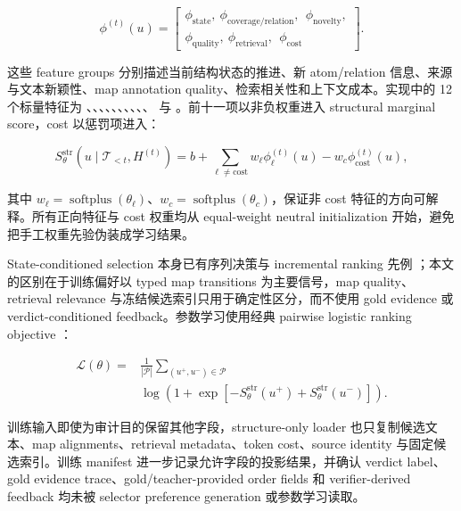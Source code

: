 \documentclass[letterpaper]{article}
\begin{document}
\[
\phi^{(t)}(u)=\left[
\begin{gathered}
\phi_{\mathrm{state}},\ \phi_{\mathrm{coverage/relation}},\
\ \phi_{\mathrm{novelty}},\\
\phi_{\mathrm{quality}},\ \phi_{\mathrm{retrieval}},\
\ \phi_{\mathrm{cost}}
\end{gathered}
\right].
\]

这些 feature groups 分别描述当前结构状态的推进、新 atom/relation 信息、来源与文本新颖性、map annotation quality、检索相关性和上下文成本。实现中的 12 个标量特征为 \texttt{}、\texttt{}、\texttt{}、\texttt{}、\texttt{}、\texttt{}、\texttt{}、\texttt{}、\texttt{}、\texttt{}、\texttt{} 与 \texttt{}。前十一项以非负权重进入 structural marginal score，cost 以惩罚项进入：

\[
S_\theta^{\mathrm{str}}(u\mid\mathcal T_{<t},H^{(t)})
=b+\sum_{\ell\ne\mathrm{cost}}w_\ell\phi_\ell^{(t)}(u)
-w_c\phi_{\mathrm{cost}}^{(t)}(u),
\]

其中 $w_\ell=\operatorname{softplus}(\theta_\ell)$、$w_c=\operatorname{softplus}(\theta_c)$，保证非 cost 特征的方向可解释。所有正向特征与 cost 权重均从 equal-weight neutral initialization 开始，避免把手工权重先验伪装成学习结果。

State-conditioned selection 本身已有序列决策与 incremental ranking 先例 \citep{Wan2021DQN,Alt2026EvidenceRanking}；本文的区别在于训练偏好以 typed map transitions 为主要信号，map quality、retrieval relevance 与冻结候选索引只用于确定性区分，而不使用 gold evidence 或 verdict-conditioned feedback。参数学习使用经典 pairwise logistic ranking objective \citep{Burges2005RankNet}：

\[
\begin{aligned}
\mathcal L(\theta)
={}&\frac{1}{|\mathcal P|}
\sum_{(u^+,u^-)\in\mathcal P}\\[-0.25ex]
&\log\!\left(1+\exp\!\left[
-S_\theta^{\mathrm{str}}(u^+)+S_\theta^{\mathrm{str}}(u^-)
\right]\right).
\end{aligned}
\]

训练输入即使为审计目的保留其他字段，structure-only loader 也只复制候选文本、map alignments、retrieval metadata、token cost、source identity 与固定候选索引。训练 manifest 进一步记录允许字段的投影结果，并确认 verdict label、gold evidence trace、gold/teacher-provided order fields 和 verifier-derived feedback 均未被 selector preference generation 或参数学习读取。
\end{document}
